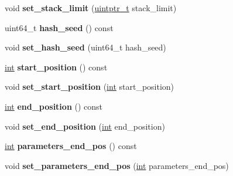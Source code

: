 \begin{DoxyCompactItemize}
\item 
\mbox{\label{classv8_1_1internal_1_1ParseInfo_abbd7f9f69c2d5446f767662f57028e97}} 
void {\bfseries set\+\_\+stack\+\_\+limit} (\mbox{\hyperlink{classuintptr__t}{uintptr\+\_\+t}} stack\+\_\+limit)
\item 
\mbox{\label{classv8_1_1internal_1_1ParseInfo_a995c1fcc9dddf17d8dc232229f9b3457}} 
uint64\+\_\+t {\bfseries hash\+\_\+seed} () const
\item 
\mbox{\label{classv8_1_1internal_1_1ParseInfo_a93f2101ae47fc841d6fe28ec1ae843b8}} 
void {\bfseries set\+\_\+hash\+\_\+seed} (uint64\+\_\+t hash\+\_\+seed)
\item 
\mbox{\label{classv8_1_1internal_1_1ParseInfo_a34dcd3aece1bf7ad4c1d89d8757958a8}} 
\mbox{\hyperlink{classint}{int}} {\bfseries start\+\_\+position} () const
\item 
\mbox{\label{classv8_1_1internal_1_1ParseInfo_a226b29a2edfb007b152b26af309915f1}} 
void {\bfseries set\+\_\+start\+\_\+position} (\mbox{\hyperlink{classint}{int}} start\+\_\+position)
\item 
\mbox{\label{classv8_1_1internal_1_1ParseInfo_a0e4c289aa658f9fbf52b941a2eb7a59c}} 
\mbox{\hyperlink{classint}{int}} {\bfseries end\+\_\+position} () const
\item 
\mbox{\label{classv8_1_1internal_1_1ParseInfo_a1869081e49bed58646462a5755ec67b8}} 
void {\bfseries set\+\_\+end\+\_\+position} (\mbox{\hyperlink{classint}{int}} end\+\_\+position)
\item 
\mbox{\label{classv8_1_1internal_1_1ParseInfo_aa0fa6795281ed6e22b159de4c8f01a45}} 
\mbox{\hyperlink{classint}{int}} {\bfseries parameters\+\_\+end\+\_\+pos} () const
\item 
\mbox{\label{classv8_1_1internal_1_1ParseInfo_afc018eccbfedcb2b6bfd53184ab3f356}} 
void {\bfseries set\+\_\+parameters\+\_\+end\+\_\+pos} (\mbox{\hyperlink{classint}{int}} parameters\+\_\+end\+\_\+pos)

\end{DoxyCompactItemize}
